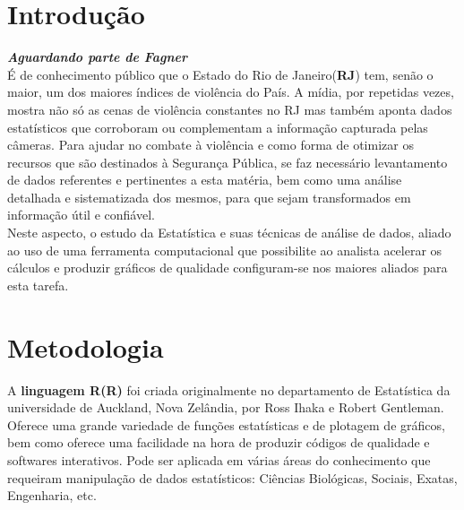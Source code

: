 \documentclass[a4paper, 12pt]{article}
\begin{document}
	\begin{multicols}{2}
		\section{Introdução}
		\large \textbf{\textit{Aguardando parte de Fagner}}\\
		
		É de conhecimento público que o Estado do Rio de Janeiro(\textbf{RJ}) tem, senão o maior, um dos maiores índices de violência do País.  A mídia, por repetidas vezes, mostra não só as cenas de violência constantes no RJ mas também aponta dados estatísticos que corroboram ou complementam a informação capturada pelas câmeras.   Para ajudar no combate à violência e como forma de otimizar os recursos que são destinados à Segurança Pública, se faz necessário levantamento de dados referentes e pertinentes a esta matéria, bem como uma análise detalhada e sistematizada dos mesmos, para que sejam transformados em informação útil e confiável.\\
		
		Neste aspecto, o estudo da Estatística e suas técnicas de análise de dados, aliado ao uso de uma ferramenta computacional que possibilite ao analista acelerar os cálculos e produzir gráficos de qualidade configuram-se nos maiores aliados para esta tarefa.
		
		\section{Metodologia}
		 A \textbf{linguagem R(R)} foi criada originalmente no departamento de Estatística da universidade de Auckland, Nova Zelândia, por Ross Ihaka e Robert Gentleman.  Oferece uma grande variedade de funções estatísticas e de plotagem de gráficos, bem como oferece uma facilidade na hora de produzir códigos de qualidade e softwares interativos.  Pode ser aplicada em várias áreas do conhecimento que requeiram manipulação de dados estatísticos:  Ciências Biológicas, Sociais, Exatas, Engenharia, etc. 
	\end{multicols}
\end{document}
